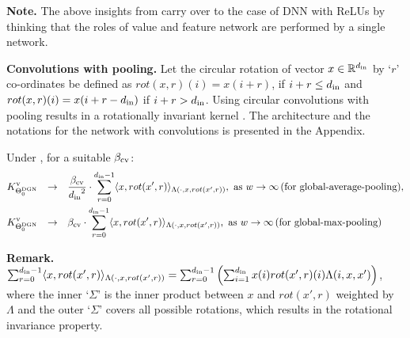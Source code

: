 \textbf{Note.} The above insights from  carry over to the case of DNN with ReLUs by thinking that the roles of value and feature network are performed by a single network.

\textbf{Convolutions with pooling.} Let the circular rotation of vector $x\in\mathbb{R}^{d_{\text{in}}}$ by `$r$' co-ordinates be defined as $rot(x,r)(i)=x(i+ r)$, if $i+r \leq d_{\text{in}}$ and $rot(x,r)(i)=x(i+ r-d_{\text{in}})$ if $i+r > d_{\text{in}}$. Using circular convolutions with pooling results in a rotationally invariant kernel . The architecture and the notations for the network with convolutions is presented in the Appendix.

\begin{theorem}\label{th:mainconv} Under , for  a suitable $\beta_{\text{cv}}$:
\begin{align*}
&K^{\text{v}}_{\Theta^{\text{DGN}}_0}&\rightarrow&\quad \frac{\beta_{\text{cv}}}{{d_{\text{in}}}^2} \cdot \sum_{r=0}^{d_{\text{in}}-1} \langle x,rot(x',r)\rangle_{\Lambda(\cdot, x,rot(x',r))},\,\, \text{as}\,\,  w\rightarrow\infty\,\text{(for global-average-pooling)}, \\
&K^{\text{v}}_{\Theta^{\text{DGN}}_0}&\rightarrow& \quad{\beta_{\text{cv}}} \cdot \sum_{r=0}^{d_{\text{in}}-1} \langle x,rot(x',r)\rangle_{\Lambda(\cdot, x,rot(x',r))},\,\, \text{as}\,\,  w\rightarrow\infty\,\text{(for global-max-pooling)}
\end{align*}
\end{theorem}
\textbf{Remark.} $\sum_{r=0}^{d_{\text{in}}-1} \langle x,rot(x',r)\rangle_{\Lambda(\cdot, x,rot(x',r))}=\sum_{r=0}^{d_{\text{in}}-1} \left(\sum_{i=1}^{d_{\text{in}}} x(i) rot(x',r)(i)\Lambda(i,x,x')\right)$, where the inner `$\Sigma$' is the inner product between $x$ and $rot(x',r)$ weighted by $\Lambda$ and the outer `$\Sigma$' covers all possible rotations, which results in the rotational invariance property.

